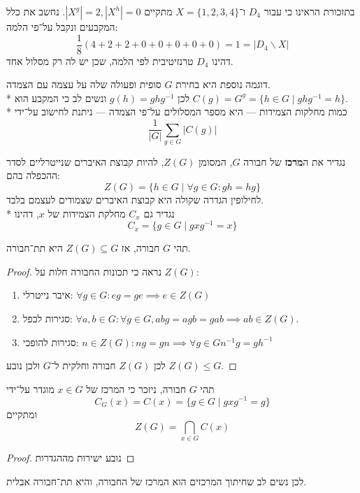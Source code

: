 \begin{example}
	בתזכורת הראינו כי עבור $D_4$ ו־$X = \{1, 2, 3, 4\}$ מתקיים $|X^g| = 2, |X^h| = 0$.
	נחשב את כלל המקבעים ונקבל על־פי הלמה:
	\[
		\frac{1}{8} (4 + 2 + 2 + 0 + 0 + 0 + 0 + 0) = 1 = |D_4 \backslash X|
	\]
	דהינו $D_4$ טרנזיטיבית לפי הלמה, שכן יש לה רק מסלול אחד.
\end{example}
דוגמה נוספת היא בחירת $G$ סופית ופעולה שלה על עצמה עם הצמדה. \\*
לכן $g(h) = ghg^{-1}$ ונשים לב כי המקבע הוא $C(g) = G^g = \{ h \in G \mid ghg^{-1} = h\}$. \\*
כמות מחלקות הצמידות --- היא מספר המסלולים על־פי הצמדה --- ניתנת לחישוב על־ידי
\[
	\frac{1}{|G|} \sum_{g \in G} |C(g)|
\]
\begin{definition}
	נגדיר את ה\textbf{מרכז} של חבורה $G$, המסומן $Z(G)$, להיות קבוצת האיברים שנייטרליים לסדר ההכפלה בהם:
	\[
		Z(G) = \{ h \in G \mid \forall g \in G : g h = h g\}
	\]
	לחילופין הגדרה שקולה היא קבוצת האיברים שצמודים לעצמם בלבד. \\*
	נגדיר גם $C_x$ מחלקת הצמידות של $x$, דהינו
	\[
		C_x = \{ g \in G \mid g x g^{-1} = x \}
	\]
\end{definition}
\begin{proposition}
	תהי $G$ חבורה, אז $Z(G) \subseteq G$ היא תת־חבורה.
\end{proposition}
\begin{proof}
	נראה כי תכונות החבורה חלות על $Z(G)$:
	\begin{enumerate}
		\item איבר נייטרלי: $\forall g \in G: eg = ge \implies e \in Z(G)$
		\item סגירות לכפל: $\forall a, b \in G : \forall g \in G, a b g = a g b = g a b \implies ab \in Z(G)$.
		\item סגירות להופכי: $n \in Z(G) : ng = gn \implies \forall g \in G n^{-1} g = g h^{-1}$
	\end{enumerate}
	לכן $Z(G)$ חבורה וחלקית ל־$G$ ולכן נובע $Z(G) \le G$.
\end{proof}

\begin{lemma}
	תהי $G$ חבורה, ניזכר כי המרכז של $x \in G$ מוגדר על־ידי
	\[
		C_G(x) = C(x) = \{ g \in G \mid g x g^{-1} = g \}
	\]
	ומתקיים
	\[
		Z(G) = \bigcap_{x \in G} C(x)
	\]
\end{lemma}
\begin{proof}
	נובע ישירות מההגדרות
\end{proof}
לכן נשים לב שחיתוך המרכזים הוא המרכז של החבורה, והיא תת־חבורה אבלית.

